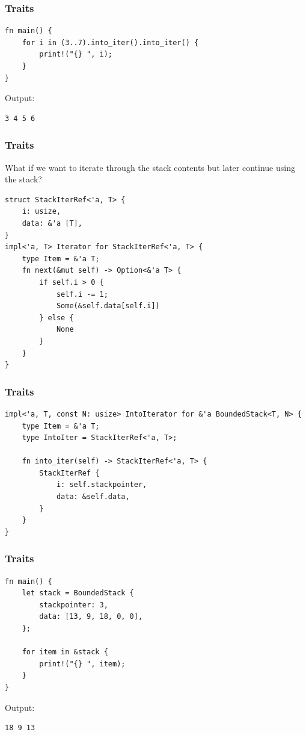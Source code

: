 \begin{frame}[fragile]
    \frametitle{Traits}
    \begin{verbatim}
fn main() {
    for i in (3..7).into_iter().into_iter() {
        print!("{} ", i);
    }
}
    \end{verbatim}
    \vfill
    Output:
    \pause
    \begin{verbatim}
3 4 5 6
    \end{verbatim}
\end{frame}

\begin{frame}[fragile]
    \frametitle{Traits}
    What if we want to iterate through the stack contents but later continue using the stack?
    \pause
    \vfill
    \begin{verbatim}
struct StackIterRef<'a, T> {
    i: usize,
    data: &'a [T],
}
impl<'a, T> Iterator for StackIterRef<'a, T> {
    type Item = &'a T;
    fn next(&mut self) -> Option<&'a T> {
        if self.i > 0 {
            self.i -= 1;
            Some(&self.data[self.i])
        } else {
            None
        }
    }
}
    \end{verbatim}
\end{frame}

\begin{frame}[fragile]
    \frametitle{Traits}
    \begin{verbatim}
impl<'a, T, const N: usize> IntoIterator for &'a BoundedStack<T, N> {
    type Item = &'a T;
    type IntoIter = StackIterRef<'a, T>;
    
    fn into_iter(self) -> StackIterRef<'a, T> {
        StackIterRef {
            i: self.stackpointer,
            data: &self.data,
        }
    }
}
    \end{verbatim}
\end{frame}

\begin{frame}[fragile]
    \frametitle{Traits}
    \begin{verbatim}
fn main() {
    let stack = BoundedStack {
        stackpointer: 3,
        data: [13, 9, 18, 0, 0],
    };

    for item in &stack {
        print!("{} ", item);
    }
}
    \end{verbatim}
    \vfill
    Output:
    \pause
    \begin{verbatim}
18 9 13 
    \end{verbatim}
\end{frame}

